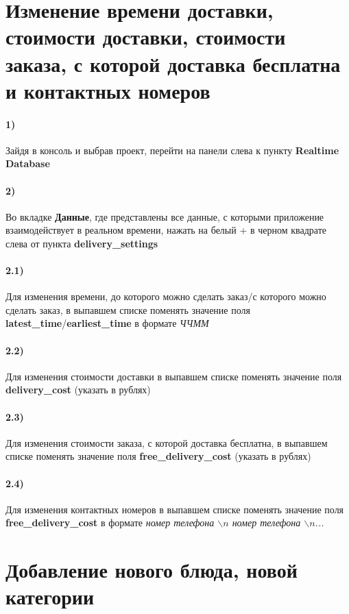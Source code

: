\documentclass{article}
\begin{document}
\section{Изменение времени доставки, стоимости доставки, стоимости заказа, с которой доставка бесплатна и контактных номеров}
  \paragraph{1)}
   {
        Зайдя в консоль и выбрав проект, перейти на панели слева к пункту \textbf{Realtime Database}
   }
  \paragraph{2)}
   {
        Во вкладке \textbf{Данные}, где представлены все данные, с которыми приложение взаимодействует в реальном времени, нажать на белый + в черном квадрате слева от пункта \textbf{delivery\_settings}
   }
  \paragraph{2.1)}
   {
        Для изменения времени, до которого можно сделать заказ/с которого можно сделать заказ, в выпавшем списке поменять значение поля \textbf{latest\_time}/\textbf{earliest\_time} в формате \textit{ЧЧММ}}
   \paragraph{2.2)}
   {
        Для изменения стоимости доставки в выпавшем списке поменять значение поля \textbf{delivery\_cost} (указать в рублях)
   }
   \paragraph{2.3)}
   {
        Для изменения стоимости заказа, с которой доставка бесплатна, в выпавшем списке поменять значение поля \textbf{free\_delivery\_cost}  (указать в рублях)
    }
   \paragraph{2.4)}
   {
        Для изменения контактных номеров в выпавшем списке поменять значение поля \textbf{free\_delivery\_cost} в формате \textit{номер телефона $\backslash n$ номер телефона $\backslash n$...}
   }
\section{Добавление нового блюда, новой категории}
\end{document}

